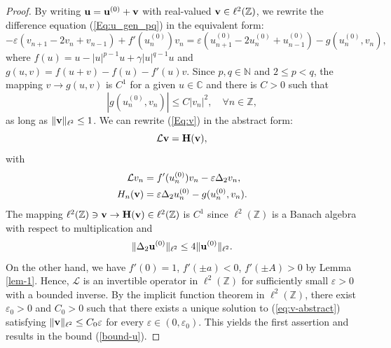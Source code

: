 \documentclass[12pt,reqno]{amsart}
\begin{document}
\begin{proof}
	By writing ${\bf u} = {\bf u}^{(0)} + {\bf v}$ with real-valued ${\bf v} \in \ell^2(\mathbb{Z})$, we rewrite the difference 
	equation (\ref{Eq:u_gen_pq}) in the equivalent form:
\begin{equation}
-\varepsilon \left(v_{n+1}-2v_n+v_{n-1}\right) + f'(u_n^{(0)}) v_n = \varepsilon \left( u_{n+1}^{(0)} - 2 u_n^{(0)} + u_{n-1}^{(0)} \right) - g(u_n^{(0)},v_n),
\label{Eq:v}
\end{equation}	
where $f(u) = u - |u|^{p-1} u + \gamma |u|^{q-1} u$ and $g(u,v) =  f(u + v) - f(u) - f'(u) v$. Since $p,q \in \mathbb{N}$ and $2 \leq p < q$, the mapping $v \to g(u,v)$ is $C^1$ for a given $u \in \mathbb{C}$ and 
there is $C > 0$ such that 
$$
|g(u_n^{(0)},v_n)| \leq C|v_n|^2, \quad \forall n \in \mathbb{Z},
$$
as long as $\|{\bf v} \|_{\ell^2} \leq 1$. We can rewrite (\ref{Eq:v}) in the abstract form:
\begin{equation}
\label{eq:v-abstract}
\mathcal{L} {\bf v} = {\bf H}({\bf v}), 
\end{equation}
with 
\begin{align*}
\mathcal{L} v_n &= f'(u_n^{(0)}) v_n - \varepsilon \Delta_2 v_n, \\
H_n({\bf v}) &= \varepsilon \Delta_2 u_n^{(0)} - g(u_n^{(0)},v_n).
\end{align*}
The mapping $\ell^2(\mathbb{Z}) \ni {\bf v} \to {\bf H}({\bf v}) \in \ell^2(\mathbb{Z})$ is $C^1$ since $\ell^2(\mathbb{Z})$ is a Banach algebra with respect to multiplication and
$$
\| \Delta_2 {\bf u}^{(0)} \|_{\ell^2} \leq 4 \|{\bf  u}^{(0)} \|_{\ell^2}. 
$$
On the other hand, we have $f'(0) = 1$, $f'(\pm a) < 0$, $f'(\pm A) > 0$ by Lemma \ref{lem-1}. Hence, $\mathcal{L}$ is an invertible operator in $\ell^2(\mathbb{Z})$ for sufficiently small $\varepsilon > 0$ with a bounded inverse. By the implicit function theorem in $\ell^2(\mathbb{Z})$, there exist $\varepsilon_0 > 0$ and $C_0 > 0$ such that there exists a unique solution 
to (\ref{eq:v-abstract})  satisfying $\| {\bf v} \|_{\ell^2} \leq C_0 \varepsilon$ for every $\varepsilon \in (0,\varepsilon_0)$. This yields the first assertion and results in the bound (\ref{bound-u}). 


\end{proof}
\end{document}
